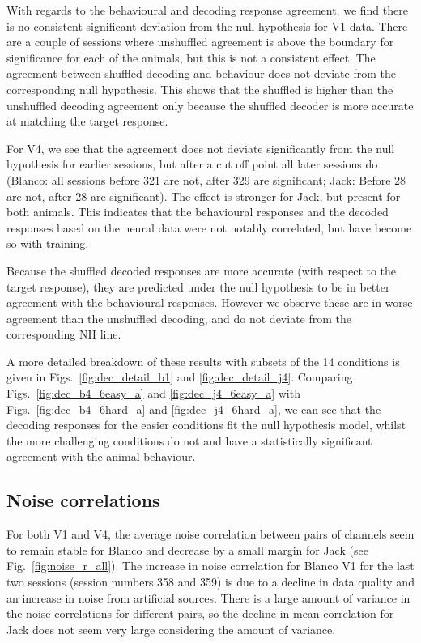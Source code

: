 With regards to the behavioural and decoding response agreement, we find there is no consistent significant deviation from the null hypothesis for V1 data. There are a couple of sessions where unshuffled agreement is above the boundary for significance for each of the animals, but this is not a consistent effect. The agreement between shuffled decoding and behaviour does not deviate from the corresponding null hypothesis. This shows that the shuffled is higher than the unshuffled decoding agreement only because the shuffled decoder is more accurate at matching the target response.

For V4, we see that the agreement does not deviate significantly from the null hypothesis for earlier sessions, but after a cut off point all later sessions do (Blanco: all sessions before 321 are not, after 329 are significant; Jack: Before 28 are not, after 28 are significant). The effect is stronger for Jack, but present for both animals.
This indicates that the behavioural responses and the decoded responses based on the neural data were not notably correlated, but have become so with training.

Because the shuffled decoded responses are more accurate (with respect to the target response), they are predicted under the null hypothesis to be in better agreement with the behavioural responses. However we observe these are in worse agreement than the unshuffled decoding, and do not deviate from the corresponding NH line.

A more detailed breakdown of these results with subsets of the 14 conditions is given in Figs.~\ref{fig:dec_detail_b1} and \ref{fig:dec_detail_j4}.
Comparing Figs.~\ref{fig:dec_b4_6easy_a} and \ref{fig:dec_j4_6easy_a} with Figs.~\ref{fig:dec_b4_6hard_a} and \ref{fig:dec_j4_6hard_a}, we can see that the decoding responses for the easier conditions fit the null hypothesis model, whilst the more challenging conditions do not and have a statistically significant agreement with the animal behaviour.




\clearpage
\subsection{Noise correlations}

For both V1 and V4, the average noise correlation between pairs of channels seem to remain stable for Blanco and decrease by a small margin for Jack (see Fig.~\ref{fig:noise_r_all}). The increase in noise correlation for Blanco V1 for the last two sessions (session numbers 358 and 359) is due to a decline in data quality and an increase in noise from artificial sources. There is a large amount of variance in the noise correlations for different pairs, so the decline in mean correlation for Jack does not seem very large considering the amount of variance.


